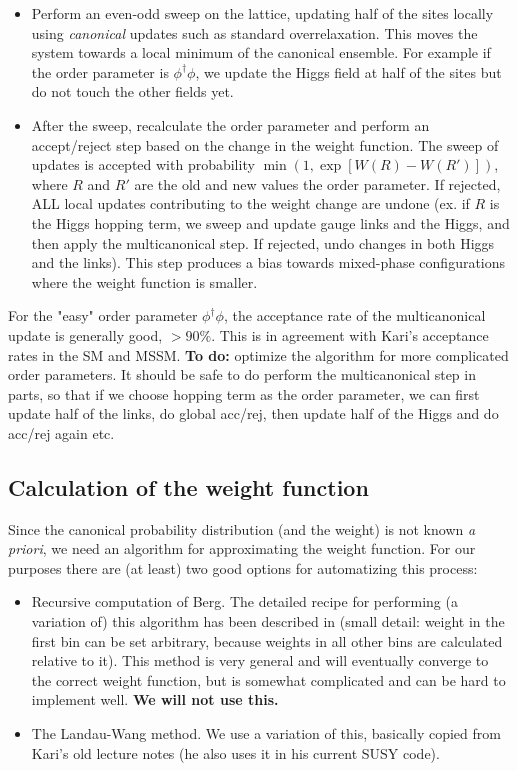 \documentclass[11pt,a4paper]{article}
\begin{document}
\begin{itemize}
	
	\item Perform an even-odd sweep on the lattice, updating half of the sites locally using \textit{canonical} updates such as standard overrelaxation. This moves the system towards a local minimum of the canonical ensemble. For example if the order parameter is $\phi^\dagger\phi$, we update the Higgs field at half of the sites but do not touch the other fields yet.
	
	\item After the sweep, recalculate the order parameter and perform an accept/reject step based on the change in the weight function. The sweep of updates is accepted with probability $\min(1, \exp[W(R) - W(R') ])$, where $R$ and $R'$ are the old and new values the order parameter. If rejected, ALL local updates contributing to the weight change are undone (ex. if $R$ is the Higgs hopping term, we sweep and update gauge links and the Higgs, and then apply the multicanonical step. If rejected, undo changes in both Higgs and the links). This step produces a bias towards mixed-phase configurations where the weight function is smaller. 
	
\end{itemize}

For the "easy" order parameter $\phi^\dagger\phi$, the acceptance rate of the multicanonical update is generally good, $>90\%$. This is in agreement with Kari's acceptance rates in the SM and MSSM. \textbf{To do:} optimize the algorithm for more complicated order parameters. It should be safe to do perform the multicanonical step in parts, so that if we choose hopping term as the order parameter, we can first update half of the links, do global acc/rej, then update half of the Higgs and do acc/rej again etc.

\subsection{Calculation of the weight function}

Since the canonical probability distribution (and the weight) is not known \textit{a priori}, we need an algorithm for approximating the weight function. For our purposes there are (at least) two good options for automatizing this process: 
\begin{itemize}
	
	\item Recursive computation of Berg. The detailed recipe for performing (a variation of) this algorithm has been described in \cite{Laine:1998qk} (small detail: weight in the first bin can be set arbitrary, because weights in all other bins are calculated relative to it). This method is very general and will eventually converge to the correct weight function, but is somewhat complicated and can be hard to implement well. \textbf{We will not use this.}
	
	\item The Landau-Wang method. We use a variation of this, basically copied from Kari's old lecture notes (he also uses it in his current SUSY code). 
	
\end{itemize}
\end{document}
